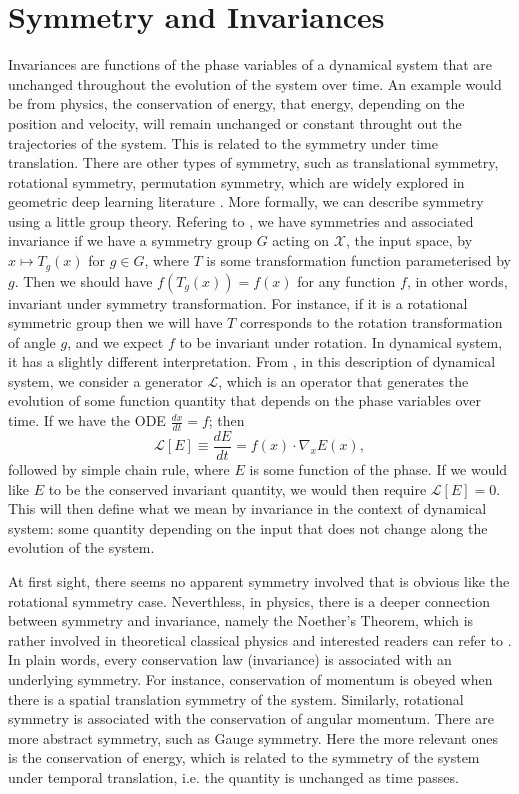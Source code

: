 \documentclass{statsmsc}
\begin{document}
\section{Symmetry and Invariances}
Invariances are functions of the phase variables of a dynamical system that are unchanged throughout the evolution of the system over time. 
An example would be from physics, the conservation of energy, that energy, depending on the position and velocity, will remain unchanged or constant throught out the trajectories of the system.
This is related to the symmetry under time translation.
There are other types of symmetry, such as translational symmetry, rotational symmetry, permutation symmetry, which are widely explored in geometric deep learning literature \citep{Bronstein2017}. 
More formally, we can describe symmetry using a little group theory.
Refering to \cite{Kondor2008}, we have symmetries and associated invariance if we have a symmetry group $G$ acting on $\mathcal{X}$, the input space, by $x\mapsto T_g(x)$ for $g\in G$, where $T$ is some transformation function parameterised by $g$. 
Then we should have $f(T_g(x))=f(x)$ for any function $f$, in other words, invariant under symmetry transformation.
For instance, if it is a rotational symmetric group then we will have $T$ corresponds to the rotation transformation of angle $g$, and we expect $f$ to be invariant under rotation.
In dynamical system, it has a slightly different interpretation.
From \cite{marsden_sirovich_antman_2008}, in this description of dynamical system, we consider a generator $\mathcal{L}$, which is an operator that generates the evolution of some function quantity that depends on the phase variables over time.
If we have the ODE $\frac{dx}{dt}=f$; then \begin{equation}\mathcal{L}[E]\equiv\frac{dE}{dt}=f(x)\cdot \nabla_x E(x),\label{equ:LE}\end{equation} followed by simple chain rule, where $E$ is some function of the phase.
If we would like $E$ to be the conserved invariant quantity, we would then require $\mathcal{L}[E]=0$. 
This will then define what we mean by invariance in the context of dynamical system: some quantity depending on the input that does not change along the evolution of the system.

At first sight, there seems no apparent symmetry involved that is obvious like the rotational symmetry case. 
Neverthless, in physics, there is a deeper connection between symmetry and invariance, namely the Noether's Theorem, which is rather involved in theoretical classical physics and interested readers can refer to \cite{lemos_2018}.
In plain words, every conservation law (invariance) is associated with an underlying symmetry.
For instance, conservation of momentum is obeyed when there is a spatial translation symmetry of the system. 
Similarly, rotational symmetry is associated with the conservation of angular momentum.
There are more abstract symmetry, such as Gauge symmetry.
Here the more relevant ones is the conservation of energy, which is related to the symmetry of the system under temporal translation, i.e. the quantity is unchanged as time passes.
\end{document}

